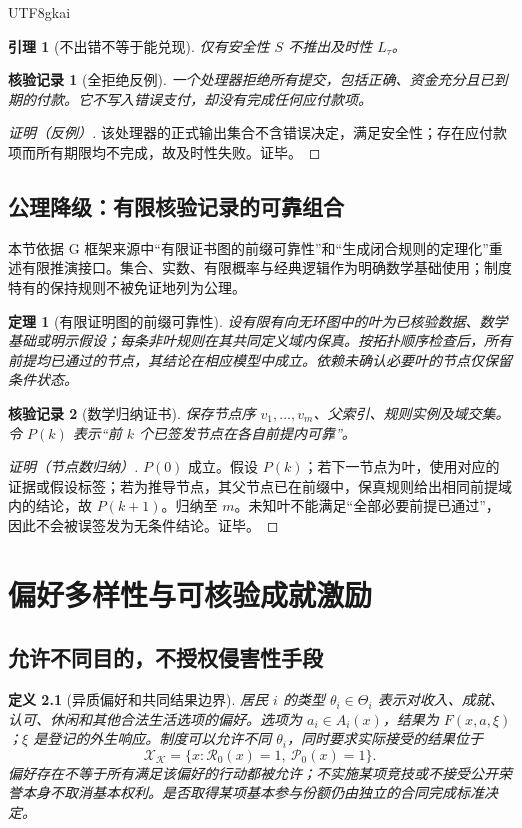\documentclass[12pt,a4paper,openany]{report}
\newtheorem{definition}{定义}[chapter]
\newtheorem{theorem}{定理}[chapter]
\newtheorem{lemma}{引理}[chapter]
\newtheorem{Certificate}{核验记录}[chapter]
\newcommand{\Charter}{\mathcal K}
\begin{document}
\begin{CJK*}{UTF8}{gkai}
\begin{lemma}[不出错不等于能兑现]
\label{lem:safety-liveness}
仅有安全性 $S$ 不推出及时性 $L_\tau$。
\end{lemma}
\begin{Certificate}[全拒绝反例]
一个处理器拒绝所有提交，包括正确、资金充分且已到期的付款。它不写入错误支付，却没有完成任何应付款项。
\end{Certificate}
\begin{proof}[证明（反例）]
该处理器的正式输出集合不含错误决定，满足安全性；存在应付款项而所有期限均不完成，故及时性失败。证毕。
\end{proof}

\section{公理降级：有限核验记录的可靠组合}
本节依据 G 框架来源中“有限证书图的前缀可靠性”和“生成闭合规则的定理化”重述有限推演接口\cite{SourceG}。集合、实数、有限概率与经典逻辑作为明确数学基础使用；制度特有的保持规则不被免证地列为公理。
\begin{theorem}[有限证明图的前缀可靠性]
\label{thm:dag}
设有限有向无环图中的叶为已核验数据、数学基础或明示假设；每条非叶规则在其共同定义域内保真。按拓扑顺序检查后，所有前提均已通过的节点，其结论在相应模型中成立。依赖未确认必要叶的节点仅保留条件状态。
\end{theorem}
\begin{Certificate}[数学归纳证书]
保存节点序 $v_1,\ldots,v_m$、父索引、规则实例及域交集。令 $P(k)$ 表示“前 $k$ 个已签发节点在各自前提内可靠”。
\end{Certificate}
\begin{proof}[证明（节点数归纳）]
$P(0)$ 成立。假设 $P(k)$；若下一节点为叶，使用对应的证据或假设标签；若为推导节点，其父节点已在前缀中，保真规则给出相同前提域内的结论，故 $P(k+1)$。归纳至 $m$。未知叶不能满足“全部必要前提已通过”，因此不会被误签发为无条件结论。证毕。
\end{proof}
\chapter{偏好多样性与可核验成就激励}
\label{chap:preferences}
\section{允许不同目的，不授权侵害性手段}
\begin{definition}[异质偏好和共同结果边界]
\label{def:preferences}
居民 $i$ 的类型 $\theta_i\in\Theta_i$ 表示对收入、成就、认可、休闲和其他合法生活选项的偏好。选项为 $a_i\in A_i(x)$，结果为 $F(x,a,\xi)$；$\xi$ 是登记的外生响应。制度可以允许不同 $\theta_i$，同时要求实际接受的结果位于
\[
 \mathcal X_{\Charter}=\{x:\mathcal R_0(x)=1,\ \mathcal P_0(x)=1\}.
\]
偏好存在不等于所有满足该偏好的行动都被允许；不实施某项竞技或不接受公开荣誉本身不取消基本权利。是否取得某项基本参与份额仍由独立的合同完成标准决定。
\end{definition}


\end{CJK*}
\end{document}
